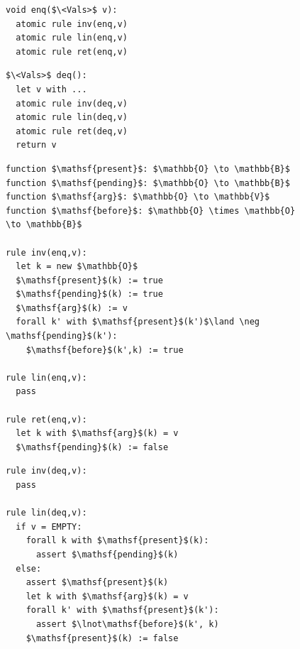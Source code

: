 \begin{figure}[t]
\hspace{-10mm}
\begin{minipage}[t]{7.5cm}
\begin{lstlisting}
void enq($\<Vals>$ v):
  atomic rule inv(enq,v)
  atomic rule lin(enq,v)
  atomic rule ret(enq,v)

\end{lstlisting}
\end{minipage}
\begin{minipage}[t]{7.5cm}
\begin{lstlisting}
$\<Vals>$ deq():
  let v with ...
  atomic rule inv(deq,v)
  atomic rule lin(deq,v)
  atomic rule ret(deq,v)
  return v

\end{lstlisting}
\end{minipage}

\begin{minipage}[t]{7.5cm}
\vspace{-3mm}
\begin{lstlisting}
function $\mathsf{present}$: $\mathbb{O} \to \mathbb{B}$
function $\mathsf{pending}$: $\mathbb{O} \to \mathbb{B}$
function $\mathsf{arg}$: $\mathbb{O} \to \mathbb{V}$
function $\mathsf{before}$: $\mathbb{O} \times \mathbb{O} \to \mathbb{B}$

rule inv(enq,v):
  let k = new $\mathbb{O}$
  $\mathsf{present}$(k) := true
  $\mathsf{pending}$(k) := true
  $\mathsf{arg}$(k) := v
  forall k' with $\mathsf{present}$(k')$\land \neg \mathsf{pending}$(k'):
    $\mathsf{before}$(k',k) := true

rule lin(enq,v):
  pass

rule ret(enq,v):
  let k with $\mathsf{arg}$(k) = v
  $\mathsf{pending}$(k) := false

\end{lstlisting}
\end{minipage}
\begin{minipage}[t]{5cm}
\vspace{-3mm}
\begin{lstlisting}
rule inv(deq,v):
  pass

rule lin(deq,v):
  if v = EMPTY:
    forall k with $\mathsf{present}$(k):
      assert $\mathsf{pending}$(k)
  else:
    assert $\mathsf{present}$(k)
    let k with $\mathsf{arg}$(k) = v
    forall k' with $\mathsf{present}$(k'):
      assert $\lnot\mathsf{before}$(k', k)
    $\mathsf{present}$(k) := false


\end{lstlisting}
\end{minipage}
\end{figure}
